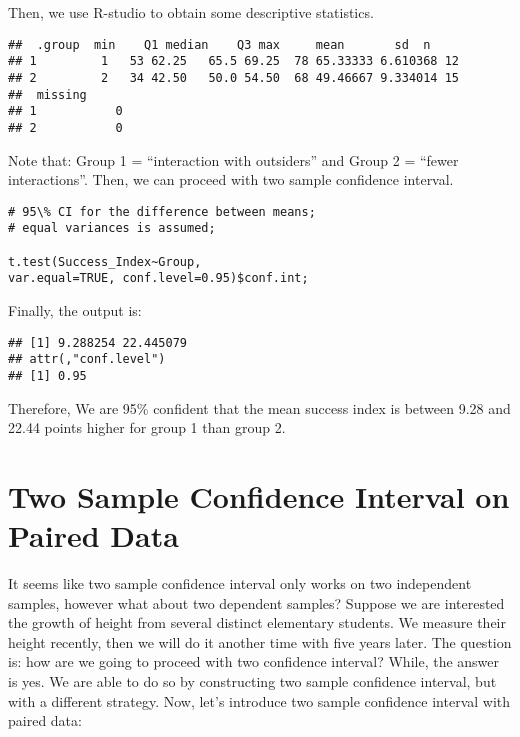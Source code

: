 \begin{example}
Then, we use R-studio to obtain some descriptive statistics.

\begin{tcolorbox}[colback=gray!10, colframe=gray!50, arc=2mm]
\begin{verbatim}
##	.group  min    Q1 median    Q3 max     mean       sd  n
## 1 		 1   53 62.25   65.5 69.25  78 65.33333 6.610368 12
## 2 		 2   34 42.50   50.0 54.50  68 49.46667 9.334014 15
## 	missing
## 1 		   0
## 2 		   0
\end{verbatim}
\end{tcolorbox}

Note that: Group 1 = “interaction with outsiders” and Group 2 = “fewer interactions”. Then, we can proceed with two sample confidence interval.

\begin{tcolorbox}[colback=gray!10, colframe=gray!50, arc=2mm]
\begin{verbatim}
# 95\% CI for the difference between means; 
# equal variances is assumed;

t.test(Success_Index~Group, 
var.equal=TRUE, conf.level=0.95)$conf.int;
\end{verbatim}
\end{tcolorbox}

Finally, the output is:

\begin{tcolorbox}[colback=gray!10, colframe=gray!50, arc=2mm]
\begin{verbatim}
## [1] 9.288254 22.445079 
## attr(,"conf.level") 
## [1] 0.95
\end{verbatim}
\end{tcolorbox}

Therefore, We are 95\% conﬁdent that the mean success index is between 9.28 and 22.44 points higher for group 1 than group 2.
\end{example}

\section{Two Sample Confidence Interval on Paired Data}

It seems like two sample confidence interval only works on two independent samples, however what about two dependent samples? Suppose we are interested the growth of height from several distinct elementary students. We measure their height recently, then we will do it another time with five years later. The question is: how are we going to proceed with two confidence interval? While, the answer is yes. We are able to do so by constructing two sample confidence interval, but with a different strategy. Now, let's introduce two sample confidence interval with paired data:

